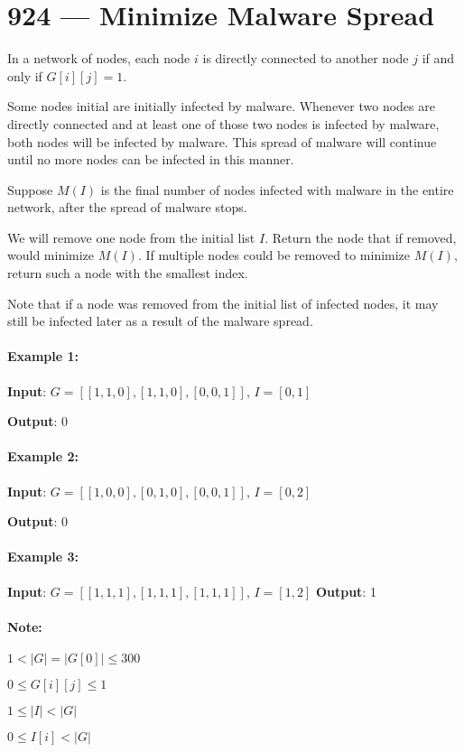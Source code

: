 \section{924 --- Minimize Malware Spread} \label{lc924}
In a network of nodes, each node $i$ is directly connected to another node $j$ if and only if $G[i][j] = 1$.
\par
Some nodes initial are initially infected by malware.  Whenever two nodes are directly connected and at least one of those two nodes is infected by malware, both nodes will be infected by malware.  This spread of malware will continue until no more nodes can be infected in this manner.
\par
Suppose $M(I)$ is the final number of nodes infected with malware in the entire network, after the spread of malware stops.
\par
We will remove one node from the initial list $I$.  Return the node that if removed, would minimize $M(I)$.  If multiple nodes could be removed to minimize $M(I)$, return such a node with the smallest index.
\par
Note that if a node was removed from the initial list of infected nodes, it may still be infected later as a result of the malware spread.
\paragraph{Example 1:}
\begin{flushleft}
\textbf{Input}: $G = [[1,1,0],[1,1,0],[0,0,1]]$, $I = [0,1]$
\par
\textbf{Output}: 0
\end{flushleft}
\paragraph{Example 2:}
\begin{flushleft}
\textbf{Input}: $G = [[1,0,0],[0,1,0],[0,0,1]]$, $I = [0,2]$
\par
\textbf{Output}: 0
\end{flushleft}
\paragraph{Example 3:}
\begin{flushleft}
\textbf{Input}: $G = [[1,1,1],[1,1,1],[1,1,1]]$, $I = [1,2]$
\textbf{Output}: 1
 \end{flushleft}
\paragraph{Note:}
\begin{flushleft}
$1 < |G| = |G[0]| \leq 300$
\par
$0 \leq G[i][j] \leq 1$
\par
$1\leq |I| < |G|$
\par
$0 \leq I[i] < |G|$
\end{flushleft}

